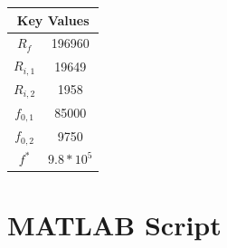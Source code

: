 \documentclass[letterpaper,12pt]{article}
\begin{document}
\begin{center}
    \begin{tabular}{ c | c }
    \multicolumn{2}{c}{Key Values} \\
    \hline
    $R_f$ & 196960\\
    $R_{i,1}$ & 19649\\
    $R_{i,2}$ & 1958\\
    $f_{0,1}$ & 85000\\
    $f_{0,2}$ & 9750\\
    $f^*$ & $9.8*10^{5}$\\
    \end{tabular}
\end{center}
\newpage
\appendix
\section{MATLAB Script}

\end{document}
